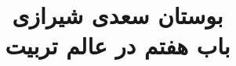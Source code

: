 \documentclass[14pt,b5paper]{article}
\begin{document}
\title{\Huge بوستان سعدی شیرازی \\
باب هفتم در عالم تربیت}
\author{ }
\date{ }
\maketitle
\newpage
\tableofcontents
\newpage

\newpage

\newpage

\newpage

\newpage

\newpage

\newpage

\newpage

\newpage

\newpage

\newpage

\newpage

\newpage

\newpage

\newpage

\newpage

\newpage

\newpage

\newpage

\newpage

\newpage

\newpage

\newpage

\newpage

\newpage

\newpage

\newpage

\newpage

\newpage

\newpage
\end{document}
